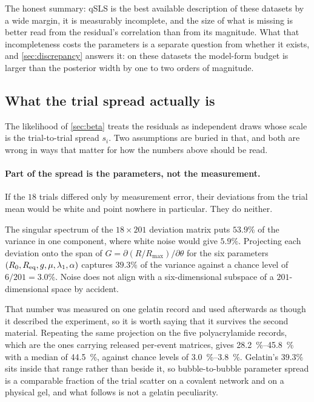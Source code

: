 \documentclass[10pt]{article}
\begin{document}
The honest summary: qSLS is the best available description of these datasets by a wide
margin, it is measurably incomplete, and the size of what is missing is better read from the
residual's correlation than from its magnitude. What that incompleteness costs the parameters
is a separate question from whether it exists, and \cref{sec:discrepancy} answers it: on these
datasets the model-form budget is larger than the posterior width by one to two orders of
magnitude.

\subsection{What the trial spread actually is}
\label{sec:latent}

The likelihood of \cref{sec:beta} treats the residuals as independent draws whose scale is
the trial-to-trial spread $s_i$. Two assumptions are buried in that, and both are wrong in
ways that matter for how the numbers above should be read.

\paragraph{Part of the spread is the parameters, not the measurement.}
If the $18$ trials differed only by measurement error, their deviations from the trial mean
would be white and point nowhere in particular. They do neither.

The singular spectrum of the $18 \times 201$ deviation matrix puts $53.9\%$ of the variance in
one component, where white noise would give $5.9\%$. Projecting each deviation onto the span
of $G = \partial (R/R_{\max})/\partial\theta$ for the six parameters
$(R_0, R_{\rm eq}, g, \mu, \lambda_1, \alpha)$ captures $39.3\%$ of the variance against a
chance level of $6/201 = 3.0\%$. Noise does not align with a six-dimensional subspace of a
$201$-dimensional space by accident.

That number was measured on one gelatin record and used afterwards as though it described the
experiment, so it is worth saying that it survives the second material. Repeating the same
projection on the five polyacrylamide records, which are the ones carrying released per-event
matrices, gives \SIrange{28.2}{45.8}{\percent} with a median of \SI{44.5}{\percent}, against
chance levels of \SIrange{3.0}{3.8}{\percent}. Gelatin's $39.3\%$ sits inside that range rather
than beside it, so bubble-to-bubble parameter spread is a comparable fraction of the trial
scatter on a covalent network and on a physical gel, and what follows is not a gelatin
peculiarity.
\end{document}
